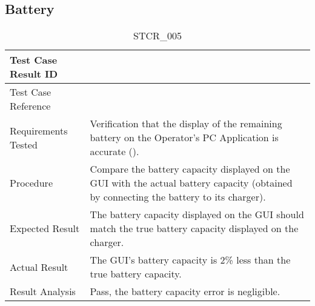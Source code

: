 \documentclass[12pt, titlepage]{article}
\begin{document}
\clearpage

\subsection{Battery}


\begin{table}[!h]
\begin{center}
\caption {STCR\_005}
\label{tab:STCR_005}
\begin{tabular}{ | m{3.2cm} | m{12.2cm} | } 
\hline
Test Case Result ID & \nameref{tab:STCR_005} \\ 
\hline
Test Case Reference & \nameref{tab:STC_005}  \\ 
\hline
Requirements Tested &  Verification that the display of the remaining battery on the Operator's PC Application is accurate (\nameref{SR_003}). \\ 
\hline
Procedure & Compare the battery capacity displayed on the GUI with the actual battery capacity (obtained by connecting the battery to its charger).  \\ 
\hline
Expected Result & The battery capacity displayed on the GUI should match the true battery capacity displayed on the charger.   \\ 
\hline
Actual Result & The GUI's battery capacity is 2\% less than the true battery capacity.  \\ 
\hline
Result Analysis & Pass, the battery capacity error is negligible.  \\ 
\hline
\end{tabular}
\end{center}
\end{table}
\end{document}
